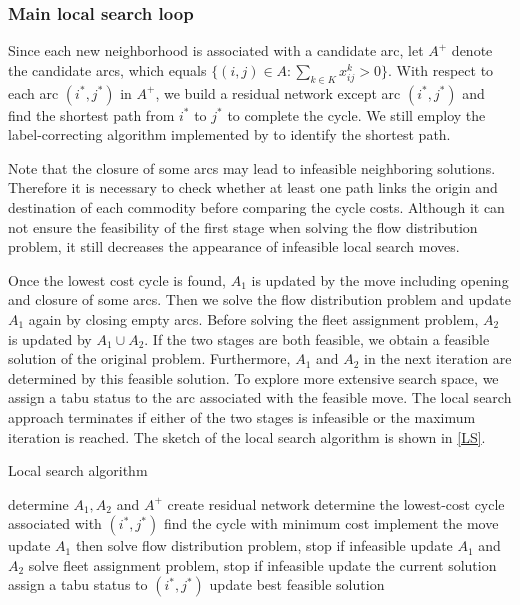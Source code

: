 \documentclass[11pt,nonblindrev,fleqn]{article}
\begin{document}
\subsubsection{Main local search loop}
Since each new neighborhood is associated with a candidate arc, let $A^+$ denote the candidate arcs, which equals $\{ (i,j)\in A: \sum_{k\in K} x_{ij}^k > 0 \}$. With respect to each arc $(i^*,j^*)$ in $A^+$, we build a residual network except arc $(i^*,j^*)$ and find the shortest path from $i^*$ to $j^*$ to complete the cycle. We still employ the label-correcting algorithm implemented by \cite{Ahuja1993Network} to identify the shortest path.

Note that the closure of some arcs may lead to infeasible neighboring solutions. Therefore it is necessary to check whether at least one path links the origin and destination of each commodity before comparing the cycle costs. Although it can not ensure the feasibility of the first stage when solving the flow distribution problem, it still decreases the appearance of infeasible local search moves.

Once the lowest cost cycle is found, $A_1$ is updated by the move including opening and closure of some arcs. Then we solve the flow distribution problem and update $A_1$ again by closing empty arcs. Before solving the fleet assignment problem, $A_2$ is updated by $A_1 \cup A_2$. If the two stages are both feasible, we obtain a feasible solution of the original problem. Furthermore, $A_1$ and $A_2$ in the next iteration are determined by this feasible solution. To explore more extensive search space, we assign a tabu status to the arc associated with the feasible move. The local search approach terminates if either of the two stages is infeasible or the maximum iteration is reached. The sketch of the local search algorithm is shown in \autoref{LS}.

\vspace{.25in}
\begin{algorithm}[H]
\caption{Local search algorithm}\label{LS}
\LinesNumbered
\SetNlSkip{1.2em}
{
    determine $A_1,A_2$ and $A^+$\;
    {
        create residual network\;
        determine the lowest-cost cycle associated with $(i^*,j^*)$\;
    }
    find the cycle with minimum cost\;
    implement the move\;
    update $A_1$ then solve flow distribution problem, stop if infeasible\;
    update $A_1$ and $A_2$\;
    solve fleet assignment problem, stop if infeasible\;
    update the current solution\;
    assign a tabu status to $(i^*,j^*)$\;
    {
        update best feasible solution\;
    }
}
\end{algorithm}
\end{document}
